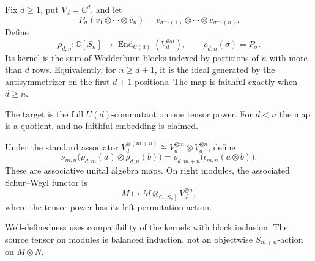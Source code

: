 \begin{definition}
Fix $d\geq1$, put $V_d=\mathbb C^d$, and let
\[
 P_\sigma(v_1\otimes\cdots\otimes v_n)
 =v_{\sigma^{-1}(1)}\otimes\cdots\otimes v_{\sigma^{-1}(n)}.
\]
Define
\[
 \rho_{d,n}:\mathbb C[S_n]\longrightarrow
 \operatorname{End}_{U(d)}(V_d^{\otimes n}),
 \qquad \rho_{d,n}(\sigma)=P_\sigma.
\]
Its kernel is the sum of Wedderburn blocks indexed by partitions of $n$ with
more than $d$ rows.  Equivalently, for $n\geq d+1$, it is the ideal generated
by the antisymmetrizer on the first $d+1$ positions.  The map is faithful
exactly when $d\geq n$.
\end{definition}
\begin{scope}
The target is the full $U(d)$-commutant on one tensor power.  For $d<n$ the
map is a quotient, and no faithful embedding is claimed.
\end{scope}

\begin{definition}
Under the standard associator
$V_d^{\otimes(m+n)}\cong V_d^{\otimes m}\otimes V_d^{\otimes n}$, define
\[
 \nu_{m,n}\bigl(\rho_{d,m}(a)\otimes\rho_{d,n}(b)\bigr)
 =\rho_{d,m+n}\bigl(\iota_{m,n}(a\otimes b)\bigr).
\]
These are associative unital algebra maps.  On right modules, the associated
Schur--Weyl functor is
\[
 M\longmapsto M\otimes_{\mathbb C[S_n]}V_d^{\otimes n},
\]
where the tensor power has its left permutation action.
\end{definition}
\begin{scope}
Well-definedness uses compatibility of the kernels with block inclusion.
The source tensor on modules is balanced induction, not an objectwise
$S_{m+n}$-action on $M\otimes N$.
\end{scope}

